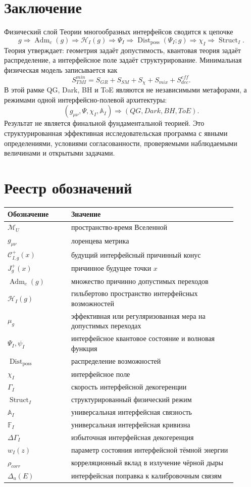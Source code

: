 \documentclass[12pt,a4paper]{article}
\DeclareMathOperator{\Adm}{Adm}
\DeclareMathOperator{\Struct}{Struct}
\DeclareMathOperator{\Dist}{Dist}
\newcommand{\M}{\mathcal M_U}
\newcommand{\Hilb}{\mathcal H}
\newcommand{\Acal}{\mathbb A_I}
\newcommand{\Fcal}{\mathbb F_I}
\begin{document}
\section{Заключение}
Физический слой Теории многообразных интерфейсов сводится к цепочке
\[
\boxed{
g\Rightarrow\Adm_c(g)\Rightarrow\Hilb_I(g)\Rightarrow\Psi_I
\Rightarrow\Dist_{\mathrm{poss}}(\Psi_I;g)
\Rightarrow\chi_I\Rightarrow\Struct_I.
}
\]
Теория утверждает: геометрия задаёт допустимость, квантовая теория задаёт распределение, а интерфейсное поле задаёт структурирование. Минимальная физическая модель записывается как
\[
\boxed{
S_{TMI}^{min}=S_{GR}+S_{SM}+S_\chi+S_{mix}+S_{dec}^{eff}.
}
\]
В этой рамке QG, Dark, BH и ToE являются не независимыми метафорами, а режимами одной интерфейсно-полевой архитектуры:
\[
\boxed{(g_{\mu\nu},\Psi,\chi_I,\Acal)\Rightarrow(QG,Dark,BH,ToE).}
\]
Результат не является финальной фундаментальной теорией. Это структурированная эффективная исследовательская программа с явными определениями, условиями согласованности, проверяемыми наблюдаемыми величинами и открытыми задачами.

\appendix
\section{Реестр обозначений}
\begin{longtable}{p{0.25\linewidth}p{0.65\linewidth}}
\toprule
Обозначение & Значение \\
\midrule
$\M$ & пространство-время Вселенной \\
$g_{\mu\nu}$ & лоренцева метрика \\
$\mathcal C^+_{I,g}(x)$ & будущий интерфейсный причинный конус \\
$J_g^+(x)$ & причинное будущее точки $x$ \\
$\Adm_c(g)$ & множество причинно допустимых переходов \\
$\Hilb_I(g)$ & гильбертово пространство интерфейсных возможностей \\
$\mu_g$ & эффективная или регуляризованная мера на допустимых переходах \\
$\Psi_I,\psi_I$ & интерфейсное квантовое состояние и волновая функция \\
$\Dist_{\mathrm{poss}}$ & распределение возможностей \\
$\chi_I$ & интерфейсное поле \\
$\Gamma_I$ & скорость интерфейсной декогеренции \\
$\Struct_I$ & структурированный физический режим \\
$\Acal$ & универсальная интерфейсная связность \\
$\Fcal$ & универсальная интерфейсная кривизна \\
$\Delta\Gamma_I$ & избыточная интерфейсная декогеренция \\
$w_I(z)$ & параметр состояния интерфейсной тёмной энергии \\
$\rho_{corr}$ & корреляционный вклад в излучение чёрной дыры \\
$\Delta_a(E)$ & интерфейсная поправка к калибровочным связям \\
\bottomrule
\end{longtable}
\end{document}
